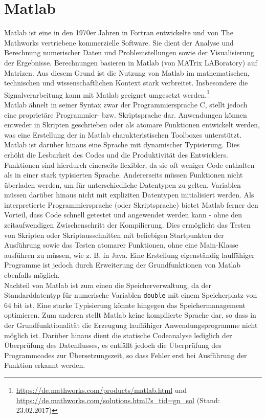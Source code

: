 \section{Matlab}

Matlab ist eine in den 1970er Jahren in Fortran entwickelte und von The Mathworks vertriebene kommerzielle Software. Sie dient der Analyse und Berechnung numerischer Daten und Problemstellungen sowie der Visualisierung der Ergebnisse. Berechnungen basieren in Matlab (von MATrix LABoratory) auf Matrizen. Aus diesem Grund ist die Nutzung von Matlab im mathematischen, technischen und wissenschaftlichen Kontext stark verbreitet. Insbesondere die Signalverarbeitung kann mit Matlab geeignet umgesetzt werden.\footnote{\url{https://de.mathworks.com/products/matlab.html} und \url{https://de.mathworks.com/solutions.html?s_tid=gn_sol} (Stand: 23.02.2017)}\\

Matlab ähnelt in seiner Syntax zwar der Programmiersprache C, stellt jedoch eine proprietäre Programmier- bzw. Skriptsprache dar. Anwendungen können entweder in Skripten geschrieben oder als atomare Funktionen entwickelt werden, was eine Erstellung der in Matlab charakteristischen Toolboxes unterstützt. Matlab ist darüber hinaus eine Sprache mit dynamischer Typisierung. Dies erhöht die Lesbarkeit des Codes und die Produktivität des Entwicklers. Funktionen sind hierdurch einerseits flexibler, da sie oft weniger Code enthalten als in einer stark typisierten Sprache. Andererseits müssen Funktionen nicht überladen werden, um für unterschiedliche Datentypen zu gelten. Variablen müssen darüber hinaus nicht mit expliziten Datentypen initialisiert werden. Als interpretierte Programmiersprache (oder Skriptsprache) bietet Matlab ferner den Vorteil, dass Code schnell getestet und angewendet werden kann - ohne den zeitaufwendigen Zwischenschritt der Kompilierung. Dies ermöglicht das Testen von Skripten oder Skriptausschnitten mit beliebigen Startpunkten der Ausführung sowie das Testen atomarer Funktionen, ohne eine Main-Klasse ausführen zu müssen, wie z. B. in Java. Eine Erstellung eigenständig lauffähiger Programme ist jedoch durch Erweiterung der Grundfunktionen von Matlab ebenfalls möglich. \parencite{stein_programmieren_2012}\\

Nachteil von Matlab ist zum einen die Speicherverwaltung, da der Standarddatentyp für numerische Variablen \texttt{double} mit einem Speicherplatz von 64 bit ist. Eine starke Typisierung könnte hingegen das Speichermanagement optimieren. Zum anderen stellt Matlab keine kompilierte Sprache dar, so dass in der Grundfunktionalität die Erzeugung lauffähiger Anwendungsprogramme nicht möglich ist. Darüber hinaus dient die statische Codeanalyse lediglich der Überprüfung des Datenflusses, es entfällt jedoch die Überprüfung des Programmcodes zur Übersetzungszeit, so dass Fehler erst bei Ausführung der Funktion erkannt werden.\\

